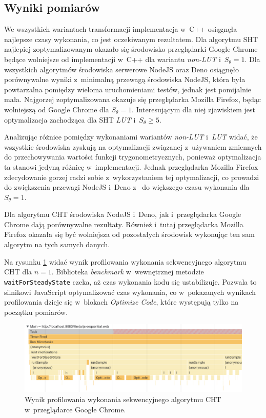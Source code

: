 \subsection{Wyniki pomiarów}

We wszystkich wariantach transformacji implementacja w~C++ osiągnęła najlepsze czasy wykonania, co jest oczekiwanym rezultatem. Dla algorytmu SHT najlepiej zoptymalizowanym okazało się środowisko przeglądarki Google Chrome będące  wolniejsze od implementacji w~C++ dla wariantu \textit{non-LUT} i~$S_\theta = 1$. Dla wszystkich algorytmów środowiska serwerowe NodeJS oraz Deno osiągnęło porównywalne wyniki z~minimalną przewagą środowiska NodeJS, która była powtarzalna pomiędzy wieloma uruchomieniami testów, jednak jest pomijalnie mała. Najgorzej zoptymalizowana okazuje się przeglądarka Mozilla Firefox, będąc  wolniejszą od Google Chrome dla $S_\theta = 1$. Interesującym dla niej zjawiskiem jest optymalizacja zachodząca dla SHT \textit{LUT} i~$S_\theta \geq 5$. 



Analizując różnice pomiędzy wykonaniami wariantów \textit{non-LUT} i~\textit{LUT} widać, że wszystkie środowiska zyskują na optymalizacji związanej z~używaniem zmiennych do przechowywania wartości funkcji trygonometrycznych, ponieważ optymalizacja ta stanowi jedyną różnicę w~implementacji. Jednak przeglądarka Mozilla Firefox zdecydowanie gorzej radzi sobie z~wykorzystaniem tej optymalizacji, co prowadzi do zwiększenia przewagi NodeJS i~Deno z~ do  większego czasu wykonania dla $S_\theta = 1$.

Dla algorytmu CHT środowiska NodeJS i~Deno, jak i~przeglądarka Google Chrome dają porównywalne rezultaty. Również i~tutaj przeglądarka Mozilla Firefox okazała się być wolniejsza od pozostałych środowisk wykonując ten sam algorytm na tych samych danych.

Na rysunku \ref{fig:profiler-seq} widać wynik profilowania wykonania sekwencyjnego algorytmu CHT dla $n=1$. Biblioteka \textit{benchmark} w~wewnętrznej metodzie \lstinline{waitForSteadyState} czeka, aż czas wykonania kodu się ustabilizuje. Pozwala to silnikowi JavaScript optymalizować czas wykonania, co w~pokazanych wynikach profilowania dzieje się w~blokach \textit{Optimize Code}, które występują tylko na początku pomiarów.

\begin{figure}[h]
    \centering
    \includegraphics[width=\linewidth]{img/seq-profiler.png}
    \caption{Wynik profilowania wykonania sekwencyjnego algorytmu CHT w~przeglądarce Google Chrome.}
    \label{fig:profiler-seq}
\end{figure}

